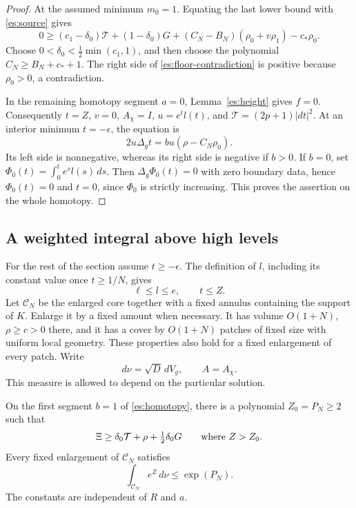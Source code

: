 \begin{proof}
At the assumed minimum $m_0=1$.  Equating the last lower bound with
\eqref{es:source} gives
\begin{equation}\label{es:floor-contradiction}
 0\ge(c_1-\delta_0)\mathcal T+(1-\delta_0)G
       +(C_N-B_N)(\rho_0+v\rho_1)-c_*\rho_0.
\end{equation}
Choose
$0<\delta_0<\frac12\min(c_1,1)$, and then choose the polynomial
$C_N\ge B_N+c_*+1$.
The right side of \eqref{es:floor-contradiction} is positive because
$\rho_0>0$, a contradiction.

In the remaining homotopy segment $a=0$,
Lemma~\ref{es:height} gives $f=0$.  Consequently
$t=Z$, $v=0$, $A_\chi=I$,
$u=e^t l(t)$, and $\mathcal T=(2p+1)|dt|^2$.
At an interior minimum $t=-\epsilon$, the equation is
\[
 2u\Delta_g t=b u(\rho-C_N\rho_0).
\]
Its left side is nonnegative, whereas its right side is negative if
$b>0$.  If $b=0$, set
$\Phi_0(t)=\int_0^t e^s l(s)\,ds$.
Then $\Delta_g\Phi_0(t)=0$ with zero boundary data, hence
$\Phi_0(t)=0$ and $t=0$, since $\Phi_0$ is strictly increasing.
This proves the assertion on the whole homotopy.
\end{proof}

\subsection{A weighted integral above high levels}

For the rest of the section assume $t\ge-\epsilon$.  The definition
of $l$, including its constant value once $t\ge1/N$, gives
\begin{equation}\label{es:warp-bounds}
 \ell\le l\le e,\qquad t\le Z.
\end{equation}
Let $\mathcal C_N$ be the enlarged core together with a fixed annulus
containing the support of $K$.  Enlarge it by a fixed amount when
necessary.  It has volume $O(1+N)$, $\rho\ge c>0$ there, and it has
a cover by $O(1+N)$ patches of fixed size with uniform local geometry.
These properties also hold for a fixed enlargement of every patch.
Write
\[
 d\nu=\sqrt D\,dV_g,\qquad A=A_\chi.
\]
This measure is allowed to depend on the particular solution.

\begin{lemma}\label{es:high-integral}
On the first segment $b=1$ of \eqref{es:homotopy}, there is a
polynomial $Z_0=P_N\ge2$ such that
\begin{equation}\label{es:high-sign}
 \Xi\ge\delta_0\mathcal T+\rho+\tfrac12\delta_0G
       \qquad\hbox{where }Z>Z_0.
\end{equation}
Every fixed enlargement of $\mathcal C_N$ satisfies
\begin{equation}\label{es:moment}
 \int_{\mathcal C_N} e^Z\,d\nu\le\exp(P_N).
\end{equation}
The constants are independent of $R$ and $a$.
\end{lemma}

